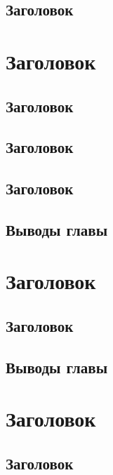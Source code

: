 \documentclass[openany]{book}
\theoremstyle{definition}
\begin{document}
\section{Заголовок}


\chapter{Заголовок}
\pagestyle{fancy}
\section{Заголовок}

\section{Заголовок}


\section{Заголовок}


\section{Выводы главы}


\chapter{Заголовок}
\pagestyle{fancy}


\section{Заголовок}






\section{Выводы главы}



\chapter{Заголовок}
\pagestyle{fancy}

\section{Заголовок}
\end{document}
